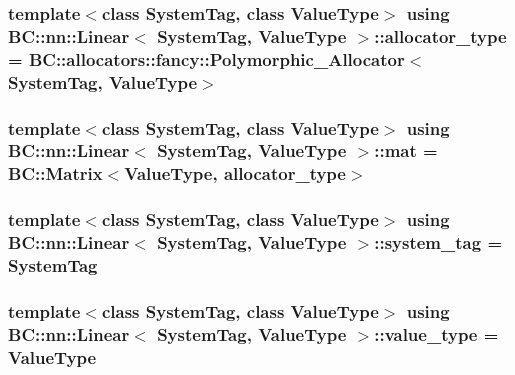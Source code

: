 \subsubsection[{\texorpdfstring{allocator\+\_\+type}{allocator_type}}]{\setlength{\rightskip}{0pt plus 5cm}template$<$class System\+Tag, class Value\+Type$>$ using {\bf B\+C\+::nn\+::\+Linear}$<$ System\+Tag, Value\+Type $>$\+::{\bf allocator\+\_\+type} =  {\bf B\+C\+::allocators\+::fancy\+::\+Polymorphic\+\_\+\+Allocator}$<$System\+Tag, Value\+Type$>$}\hypertarget{classBC_1_1nn_1_1Linear_aec884ef89e09cbcbc77cfaf8acfdc7ae}{}\label{classBC_1_1nn_1_1Linear_aec884ef89e09cbcbc77cfaf8acfdc7ae}
\subsubsection[{\texorpdfstring{mat}{mat}}]{\setlength{\rightskip}{0pt plus 5cm}template$<$class System\+Tag, class Value\+Type$>$ using {\bf B\+C\+::nn\+::\+Linear}$<$ System\+Tag, Value\+Type $>$\+::{\bf mat} =  {\bf B\+C\+::\+Matrix}$<$Value\+Type, {\bf allocator\+\_\+type}$>$}\hypertarget{classBC_1_1nn_1_1Linear_a33a0fc0ae9bad4f6af4414fd9a27f473}{}\label{classBC_1_1nn_1_1Linear_a33a0fc0ae9bad4f6af4414fd9a27f473}
\subsubsection[{\texorpdfstring{system\+\_\+tag}{system_tag}}]{\setlength{\rightskip}{0pt plus 5cm}template$<$class System\+Tag, class Value\+Type$>$ using {\bf B\+C\+::nn\+::\+Linear}$<$ System\+Tag, Value\+Type $>$\+::{\bf system\+\_\+tag} =  System\+Tag}\hypertarget{classBC_1_1nn_1_1Linear_ad5d1417607b13e05aa6ac48f196b2f4f}{}\label{classBC_1_1nn_1_1Linear_ad5d1417607b13e05aa6ac48f196b2f4f}
\subsubsection[{\texorpdfstring{value\+\_\+type}{value_type}}]{\setlength{\rightskip}{0pt plus 5cm}template$<$class System\+Tag, class Value\+Type$>$ using {\bf B\+C\+::nn\+::\+Linear}$<$ System\+Tag, Value\+Type $>$\+::{\bf value\+\_\+type} =  Value\+Type}\hypertarget{classBC_1_1nn_1_1Linear_ae8c65a46a545fe1e5efe9db19dbc3ae2}{}\label{classBC_1_1nn_1_1Linear_ae8c65a46a545fe1e5efe9db19dbc3ae2}
